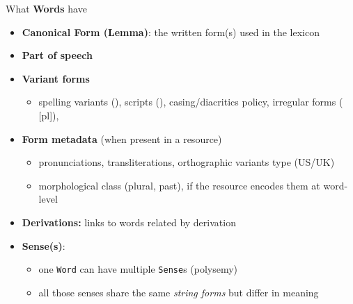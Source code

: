 \documentclass[aspectratio=169]{beamer}
\begin{document}
\begin{frame}{What  \textbf{Words} have}
\begin{itemize}
  \item \textbf{Canonical Form (Lemma)}: the written form(s) used in the lexicon
  \item \textbf{Part of speech}
  \item \textbf{Variant forms}
    \begin{itemize}
    \item spelling variants (), scripts (), casing/diacritics policy,
      irregular forms  ( [pl]), 
    \end{itemize}
  \item \textbf{Form metadata} (when present in a resource)
    \begin{itemize}
      \item pronunciations, transliterations, orthographic variants type (US/UK)
      \item morphological class (plural, past), if the resource encodes them at word-level
    \end{itemize}
  \item \textbf{Derivations:} links to words related by derivation 
  \item \textbf{Sense(s)}:
    \begin{itemize}
      \item one \texttt{Word} can have multiple \texttt{Sense}s (polysemy)
      \item all those senses share the same \emph{string forms} but differ in meaning
    \end{itemize}
\end{itemize}

\end{frame}
\end{document}

